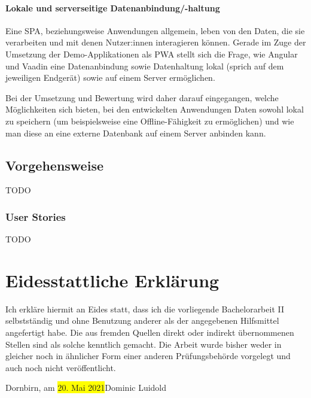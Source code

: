 \documentclass[a4paper,12pt,twoside]{scrreprt}
\begin{document}
\subsubsection*{Lokale und serverseitige Datenanbindung/-haltung}
\label{sub-sec:kriterien-datenanbindung}
Eine \ac{SPA}, beziehungsweise Anwendungen allgemein, leben von den Daten, die sie verarbeiten und mit denen Nutzer:innen interagieren können. Gerade im Zuge der Umsetzung der Demo-Applikationen als \ac{PWA} stellt sich die Frage, wie Angular und Vaadin eine Datenanbindung sowie Datenhaltung lokal (sprich auf dem jeweiligen Endgerät) sowie auf einem Server ermöglichen.

Bei der Umsetzung und Bewertung wird daher darauf eingegangen, welche Möglichkeiten sich bieten, bei den entwickelten Anwendungen Daten sowohl lokal zu speichern (um beispielsweise eine Offline-Fähigkeit zu ermöglichen) und wie man diese an eine externe Datenbank auf einem Server anbinden kann.

\section{Vorgehensweise}
\label{sec:vorgehensweise}
TODO

\subsection{User Stories}
\label{sub-sec:user-stories}
TODO

\clearpage
{}
{}
\printbibliography

\chapter*{Eidesstattliche Erklärung}
Ich erkläre hiermit an Eides statt, dass ich die vorliegende Bachelorarbeit II selbstständig und ohne Benutzung anderer als der angegebenen Hilfsmittel angefertigt habe. Die aus fremden Quellen direkt oder indirekt übernommenen Stellen sind als solche kenntlich gemacht. Die Arbeit wurde bisher weder in gleicher noch in ähnlicher Form einer anderen Prüfungsbehörde vorgelegt und auch noch nicht veröffentlicht.

\vspace{5cm}
\noindent
Dornbirn, am \colorbox{yellow}{20. Mai 2021}\hfill Dominic Luidold
\end{document}
